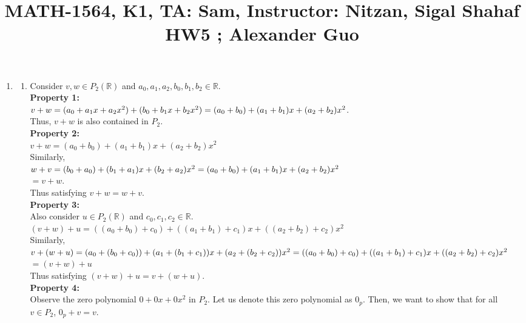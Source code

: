 \documentclass{article}
\title{\large{\vspace{-1.0cm}MATH-1564, K1, TA: Sam, Instructor: Nitzan, Sigal Shahaf \\ HW5 ; Alexander Guo}}
\date{}
\begin{document}
\maketitle

\vspace{-1.5cm}
\large

\begin{enumerate}

\item

\begin{enumerate}

\item
 Consider $v,w \in P_2(\mathbb{R})$ and $a_0,a_1,a_2,b_0,b_1,b_2 \in \mathbb{R}$. \\
\textbf{Property 1:}\\ $v + w = (a_0 + a_1x + a_2x^2) + (b_0 + b_1x + b_2x^2)
\\= (a_0 + b_0) + (a_1 + b_1)x + (a_2 + b_2)x^2$. \\Thus, $v+w$ is also contained in $P_2$. \\
\textbf{Property 2:} \\$v + w = (a_0 + b_0) + (a_1 + b_1)x + (a_2 + b_2)x^2$ \\Similarly,\\ $w + v = (b_0 + a_0) + (b_1 + a_1)x + (b_2 + a_2)x^2\\=(a_0 + b_0) + (a_1 + b_1)x + (a_2 + b_2)x^2$ \\
$= v + w$. \\Thus satisfying $v + w = w + v$.\\
\textbf{Property 3:}\\Also consider $u \in P_2(\mathbb{R})$ and $c_0,c_1,c_2 \in \mathbb{R}$. \\ $(v + w) + u
= ((a_0 + b_0) + c_0) + ((a_1 + b_1) + c_1)x + ((a_2 + b_2) + c_2)x^2$\\Similarly,\\$v + (w + u) = (a_0 + (b_0 + c_0)) + (a_1 + (b_1 + c_1))x + (a_2 + (b_2 + c_2))x^2\\
=((a_0 + b_0) + c_0) + ((a_1 + b_1) + c_1)x + ((a_2 + b_2) + c_2)x^2$\\ $= (v + w) + u$ \\
Thus satisfying $(v + w) + u = v + (w + u)$.\\
\textbf{Property 4:}\\Observe the zero polynomial $0 + 0x + 0x^2$ in $P_2$. Let us denote this zero polynomial as $0_p$. Then, we want to show that for all $v \in P_2$, $0_p + v = v$.\\

\end{enumerate}
\end{enumerate}
\end{document}
